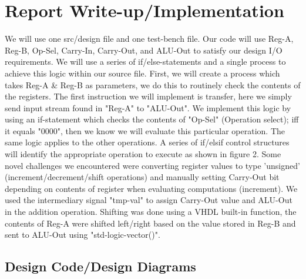 \documentclass[notitlepage,a4paper,oneside,article,table]{article}
\begin{document}
\section{Report Write-up/Implementation}

We will use one src/design file and one test-bench file. Our code will use Reg-A, Reg-B, Op-Sel, Carry-In, Carry-Out, and ALU-Out to satisfy our design I/O requirements. We will use a series of if/else-statements and a single process to achieve this logic within our source file. First, we will create a process which takes Reg-A \& Reg-B as parameters, we do this to routinely check the contents of the registers. The first instruction we will implement is transfer, here we simply send input stream found in "Reg-A" to "ALU-Out". We implement this logic by using an if-statement which checks the contents of "Op-Sel" (Operation select); iff it equals "0000", then we know we will evaluate this particular operation. The same logic applies to the other operations. A series of if/elsif control structures will identify the appropriate operation to execute as shown in figure 2. Some novel challenges we encountered were converting register values to type 'unsigned' (increment/decrement/shift operations) and manually setting Carry-Out bit depending on contents of register when evaluating computations (increment). We used the intermediary signal "tmp-val" to assign Carry-Out value and ALU-Out in the addition operation. Shifting was done using a VHDL built-in function, the contents of Reg-A were shifted left/right based on the value stored in Reg-B and sent to ALU-Out using "std-logic-vector()".

\subsection{Design Code/Design Diagrams}
\end{document}

